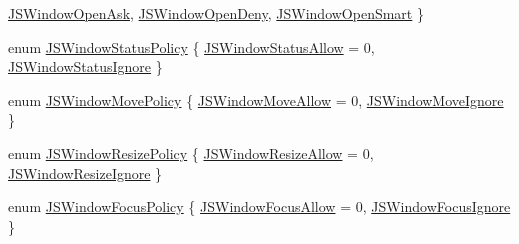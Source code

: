 \begin{DoxyCompactItemize}
\hyperlink{classKParts_1_1HtmlSettingsInterface_aab245c057a7179fc1bdc16e020750643a3b5d146c17900bcb3ac5a3c40762400b}{\-J\-S\-Window\-Open\-Ask}, 
\hyperlink{classKParts_1_1HtmlSettingsInterface_aab245c057a7179fc1bdc16e020750643a7855bf2e8181c4ed74c47ef5c305ea66}{\-J\-S\-Window\-Open\-Deny}, 
\hyperlink{classKParts_1_1HtmlSettingsInterface_aab245c057a7179fc1bdc16e020750643aeb4533569b1d543c35bcbe2c13b4e0aa}{\-J\-S\-Window\-Open\-Smart}
 \}
\item 
enum \hyperlink{classKParts_1_1HtmlSettingsInterface_a88188ac567388141e0b1b988ae71961f}{\-J\-S\-Window\-Status\-Policy} \{ \hyperlink{classKParts_1_1HtmlSettingsInterface_a88188ac567388141e0b1b988ae71961fad04d2617a3d59e82bb71b11eb8f522c4}{\-J\-S\-Window\-Status\-Allow} = 0, 
\hyperlink{classKParts_1_1HtmlSettingsInterface_a88188ac567388141e0b1b988ae71961fa43c54134ec0c80999f2cf5ef0644ca71}{\-J\-S\-Window\-Status\-Ignore}
 \}
\item 
enum \hyperlink{classKParts_1_1HtmlSettingsInterface_a2774dbe8635ec916babf19de468d6c34}{\-J\-S\-Window\-Move\-Policy} \{ \hyperlink{classKParts_1_1HtmlSettingsInterface_a2774dbe8635ec916babf19de468d6c34a737536429edb7501bfc0a0e094c31005}{\-J\-S\-Window\-Move\-Allow} = 0, 
\hyperlink{classKParts_1_1HtmlSettingsInterface_a2774dbe8635ec916babf19de468d6c34affadad155cdf06f9eb98da8e1aa7cbb1}{\-J\-S\-Window\-Move\-Ignore}
 \}
\item 
enum \hyperlink{classKParts_1_1HtmlSettingsInterface_a0fcf7802e2f831ee1449e82713f6f359}{\-J\-S\-Window\-Resize\-Policy} \{ \hyperlink{classKParts_1_1HtmlSettingsInterface_a0fcf7802e2f831ee1449e82713f6f359ae2869f76bc4f064d4a60b89d09f043c8}{\-J\-S\-Window\-Resize\-Allow} = 0, 
\hyperlink{classKParts_1_1HtmlSettingsInterface_a0fcf7802e2f831ee1449e82713f6f359ae1c6f55c12b5abb6cafb06128334667a}{\-J\-S\-Window\-Resize\-Ignore}
 \}
\item 
enum \hyperlink{classKParts_1_1HtmlSettingsInterface_a3c00e5813af380f956480b47a76fdf8c}{\-J\-S\-Window\-Focus\-Policy} \{ \hyperlink{classKParts_1_1HtmlSettingsInterface_a3c00e5813af380f956480b47a76fdf8ca3eff6842f00de1e9ceef9a2f86e55e52}{\-J\-S\-Window\-Focus\-Allow} = 0, 
\hyperlink{classKParts_1_1HtmlSettingsInterface_a3c00e5813af380f956480b47a76fdf8cacc28bfbd61e4ae293d1201b4586b817a}{\-J\-S\-Window\-Focus\-Ignore}
 \}
\end{DoxyCompactItemize}
